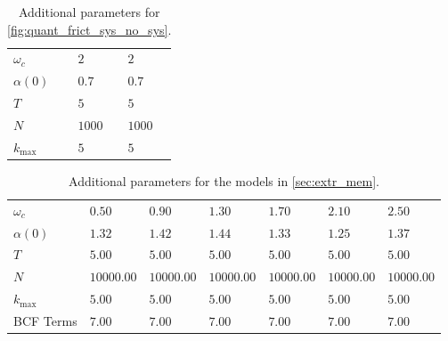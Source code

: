 \begin{table}[H]
  \centering
  \begin{tabular}{lll}
    \hline
    $ω_c$              & $2$    & $2$    \\
    $α(0)$             & $0.7$  & $0.7$  \\
    $T$                & $5$    & $5$    \\
    $N$                & $1000$ & $1000$ \\
    $k_{\mathrm{max}}$ & $5$    & $5$    \\
    \hline
  \end{tabular}
  \caption{\label{tab:plus_system}Additional parameters for
    \cref{fig:quant_frict_sys_no_sys}.}
\end{table}

\begin{table}[H]
  \centering
  \begin{tabular}{lllllll}
    \hline
    $ω_c$              & $0.50$     & $0.90$     & $1.30$     & $1.70$     & $2.10$     & $2.50$     \\
    $α(0)$             & $1.32$     & $1.42$     & $1.44$     & $1.33$     & $1.25$     & $1.37$     \\
    $T$                & $5.00$     & $5.00$     & $5.00$     & $5.00$     & $5.00$     & $5.00$     \\
    $N$                & $10000.00$ & $10000.00$ & $10000.00$ & $10000.00$ & $10000.00$ & $10000.00$ \\
    $k_{\mathrm{max}}$ & $5.00$     & $5.00$     & $5.00$     & $5.00$     & $5.00$     & $5.00$     \\
    BCF Terms          & $7.00$     & $7.00$     & $7.00$     & $7.00$     & $7.00$     & $7.00$     \\
    \hline
  \end{tabular}

  \caption{\label{tab:plus_omega}Additional parameters for the models in
     \cref{sec:extr_mem}.}
\end{table}

